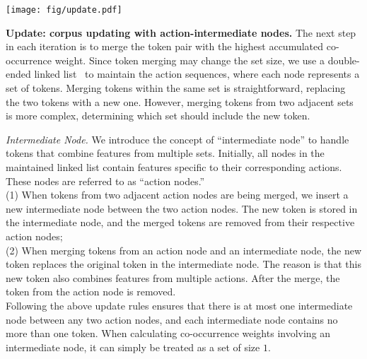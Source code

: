 

\begin{figure*}[!t]
\begin{center}
\centerline{\texttt{[image: fig/update.pdf]}}
\end{center}
\vskip -0.3in
\caption{Illustration of how the linked list, which maintains the action sequence, is updated when merging two tokens into a new token. Three cases are considered: (1) both tokens are in the same action node; (2) the tokens are in two adjacent action nodes; (3) one token is in an action node, while the other is in an intermediate node.}
\label{fig:update}
\vskip -0.1in
\end{figure*}


\textbf{Update: corpus updating with action-intermediate nodes.} The next step in each iteration is to merge the token pair with the highest accumulated co-occurrence weight. Since token merging may change the set size, we use a double-ended linked list~\cite{zouhar2023formal} to maintain the action sequences, where each node represents a set of tokens. Merging tokens within the same set is straightforward, \ie replacing the two tokens with a new one. However, merging tokens from two adjacent sets is more complex, \eg determining which set should include the new token.

\emph{Intermediate Node.} We introduce the concept of ``intermediate node'' to handle tokens that combine features from multiple sets. Initially, all nodes in the maintained linked list contain features specific to their corresponding actions. These nodes are referred to as ``action nodes.''\\
\hspace*{3mm} (1) When tokens from two adjacent action nodes are being merged, we insert a new intermediate node between the two action nodes. The new token is stored in the intermediate node, and the merged tokens are removed from their respective action nodes;\\
\hspace*{3mm} (2) When merging tokens from an action node and an intermediate node, the new token replaces the original token in the intermediate node. The reason is that this new token also combines features from multiple actions. After the merge, the token from the action node is removed.\\
\hspace*{3mm} Following the above update rules ensures that there is at most one intermediate node between any two action nodes, and each intermediate node contains no more than one token. When calculating co-occurrence weights involving an intermediate node, it can simply be treated as a set of size $1$.

